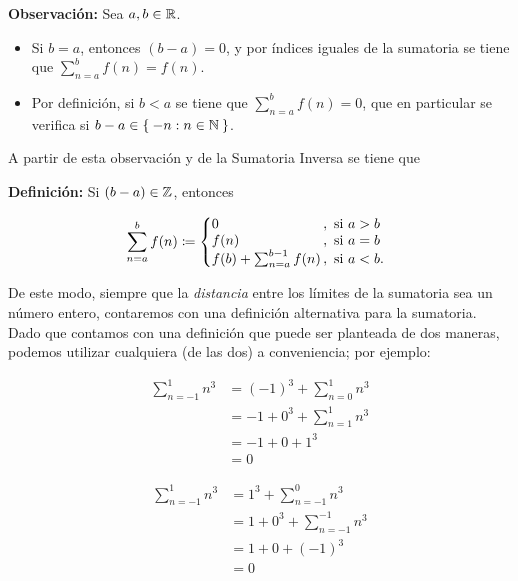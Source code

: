     \textbf{Observación:} Sea $a,b\in \mathbb{R}$.
    \begin{itemize}
      \item Si $b=a$, entonces $(b-a)=0$, y por índices iguales de la sumatoria se tiene que $\sum_{n=a}^{b} f(n) = f(n)$.
      \item Por definición, si $b<a$ se tiene que $\sum_{n=a}^{b} f(n) =0$, que en particular se verifica si $b-a\in \Set{-n:n\in \mathbb{N}}$.
    \end{itemize}
    A partir de esta observación y de la Sumatoria Inversa se tiene que

    \textbf{Definición:} Si $(b-a)\in \mathbb{Z}$, entonces

    \[\sum_{n=a}^{b} f(n) \defined \left\{
    \begin{array}{@{}l@{\thinspace}l}
      0 &,  \ \text{si}  \ a>b\\
      f(n) &,  \ \text{si}  \ a=b\\
      f(b) + \sum_{n=a}^{b-1} f(n) &,  \ \text{si}  \ a<b.
    \end{array} \right. \]

    De este modo, siempre que la \textit{distancia} entre los límites de la sumatoria sea un número entero, contaremos con una definición alternativa para la sumatoria. Dado que contamos con una definición que puede ser planteada de dos maneras, podemos utilizar cualquiera (de las dos) a conveniencia; por ejemplo:
\begin{center}
  \begin{minipage}[c]{.5\linewidth}
    \begin{align*}
      \sum_{n=-1}^{1} n^3 &= (-1)^3 + \sum_{n=0}^{1} n^3\\
      &= -1 + 0^3 + \sum_{n=1}^1 n^3\\
      &= -1 + 0 + 1^3\\
      &= 0
    \end{align*}
   \end{minipage}%
  \begin{minipage}[c]{.5\linewidth}
    \begin{align*}
      \sum_{n=-1}^{1} n^3 &= 1^3 + \sum_{n=-1}^{0} n^3\\
      &= 1 + 0^3 + \sum_{n=-1}^{-1} n^3\\
      &= 1 + 0 + (-1)^3\\
      &= 0
    \end{align*}
  \end{minipage}
  \end{center}

